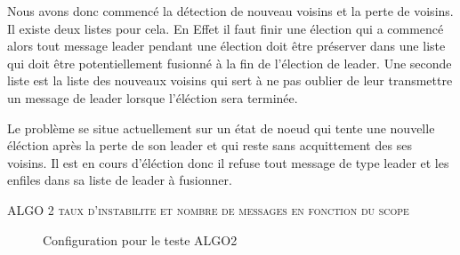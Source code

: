 \documentclass[11pt,a4paper,sans]{report}
\begin{document}
	\par Nous avons donc commencé la détection de nouveau voisins et la perte de voisins. Il existe deux listes pour cela. En Effet il faut finir une élection qui a commencé alors tout message leader pendant une élection doit être préserver dans une liste qui doit être potentiellement fusionné à la fin de l'élection de leader. Une seconde liste est la liste des nouveaux voisins qui sert à ne pas oublier de leur transmettre un message de leader lorsque l'éléction sera terminée.

	\par Le problème se situe actuellement sur un état de noeud qui tente une nouvelle éléction après la perte de son leader et qui reste sans acquittement des ses voisins. Il est en cours d'éléction donc il refuse tout message de type leader et les enfiles dans sa liste de leader à fusionner. 

	\newpage
	\textsc{\large ALGO 2 taux d'instabilite et nombre de messages en fonction du scope}

	\begin{figure}[H]
		\caption{Configuration pour le teste ALGO2}
	\end{figure}
\end{document}
